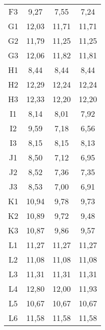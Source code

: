 \begin{center}
\begin{longtable}{cccc}
    F3    & 9,27  & 7,55  & 7,24 \\
    G1    & 12,03 & 11,71 & 11,71 \\
    G2    & 11,79 & 11,25 & 11,25 \\
    G3    & 12,06 & 11,82 & 11,81 \\
    H1    & 8,44  & 8,44  & 8,44 \\
    H2    & 12,29 & 12,24 & 12,24 \\
    H3    & 12,33 & 12,20 & 12,20 \\
    I1    & 8,14  & 8,01  & 7,92 \\
    I2    & 9,59  & 7,18  & 6,56 \\
    I3    & 8,15  & 8,15  & 8,13 \\
    J1    & 8,50  & 7,12  & 6,95 \\
    J2    & 8,52  & 7,36  & 7,35 \\
    J3    & 8,53  & 7,00  & 6,91 \\
    K1    & 10,94 & 9,78  & 9,73 \\
    K2    & 10,89 & 9,72  & 9,48 \\
    K3    & 10,87 & 9,86  & 9,57 \\
    L1    & 11,27 & 11,27 & 11,27 \\
    L2    & 11,08 & 11,08 & 11,08 \\
    L3    & 11,31 & 11,31 & 11,31 \\
    L4    & 12,80 & 12,00 & 11,93 \\
    L5    & 10,67 & 10,67 & 10,67 \\
    L6    & 11,58 & 11,58 & 11,58 \\


\end{longtable}
\end{center}

